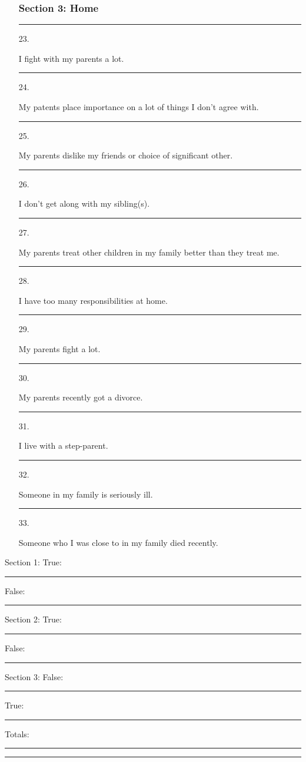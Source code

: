 \documentclass[letterpaper, 12pt]{article}
\begin{document}
\begin{enumerate}
    \subsubsection*{Section 3: Home}
    \item [\rule{0.3in}{0.01in} 23.] I fight with my parents a lot. 
    \item [\rule{0.3in}{0.01in} 24.] My patents place importance on a lot of things I don't agree with. 
    \item [\rule{0.3in}{0.01in} 25.] My parents dislike my friends or choice of significant other. 
    \item [\rule{0.3in}{0.01in} 26.] I don't get along with my sibling(s).
    \item [\rule{0.3in}{0.01in} 27.] My parents treat other children in my family better than they treat me. 
    \item [\rule{0.3in}{0.01in} 28.] I have too many responsibilities at home. 
    \item [\rule{0.3in}{0.01in} 29.] My parents fight a lot. 
    \item [\rule{0.3in}{0.01in} 30.] My parents recently got a divorce.  
    \item [\rule{0.3in}{0.01in} 31.] I live with a step-parent.
    \item [\rule{0.3in}{0.01in} 32.] Someone in my family is seriously ill. 
    \item [\rule{0.3in}{0.01in} 33.] Someone who I was close to in my family died recently.  
 	
\end{enumerate}

\vspace{.5in}

Section 1: True: \rule{0.5in}{0.01in} \hspace{0.5 in} False: \rule{0.5in}{0.01in}

Section 2: True: \rule{0.5in}{0.01in} \hspace{0.5 in} False: \rule{0.5in}{0.01in}

Section 3: False: \rule{0.5in}{0.01in} \hspace{0.5 in} True: \rule{0.5in}{0.01in}

Totals:  \hspace{0.6in}  \rule{0.5in}{0.01in} \hspace{.95 in} \rule{0.5in}{0.01in}
\end{document}

